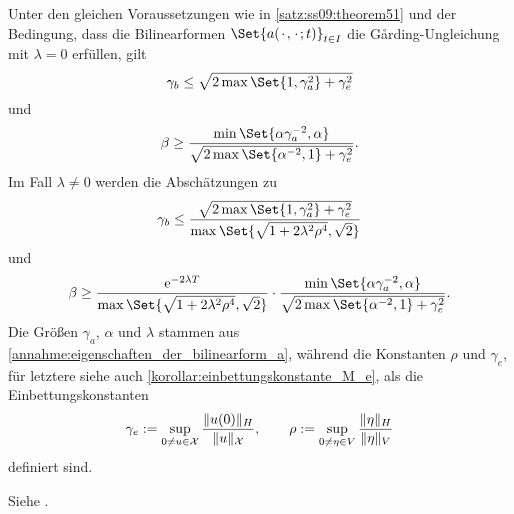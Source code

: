 \documentclass[../main.tex]{subfiles}
\begin{document}
\begin{Korollar}
\label{korrolar:ss09:theorem51_abschaetzungen}
    Unter den gleichen Voraussetzungen wie in \cref{satz:ss09:theorem51} und der Bedingung, dass die Bilinearformen $\Set{a(\blank, \blank; t)}_{t \in I}$ die G\aa{}rding-Ungleichung mit $\lambda = 0$ erfüllen, gilt
    \begin{equation}
        \label{eq:ss09:theorem51_abschaetzungen:lambda_null:stetig}
        \gamma_{b}  \leq \sqrt{2 \max\Set{1, \gamma_{a}^{2}} + \gamma_{e}^{2}}
    \end{equation}
    und
    \begin{equation}
        \label{eq:ss09:theorem51_abschaetzungen:lambda_null:inf_sup}
        \beta  \geq \frac{\min\Set{\alpha \gamma_{a}^{-2}, \alpha}}{\sqrt{2 \max \Set{\alpha^{-2}, 1} + \gamma_{e}^{2}}}.
    \end{equation}
    Im Fall $\lambda \neq 0$ werden die Abschätzungen zu
    \begin{equation}
        \label{eq:ss09:theorem51_abschaetzungen:lambda_nicht_null:stetig}
        \gamma_{b}  \leq \frac{\sqrt{2\max\Set{1, \gamma_{a}^{2}} + \gamma_{e}^{2}}}{\max\Set{\sqrt{1 + 2 \lambda^{2} \rho^{4}}, \sqrt{2}}}
    \end{equation}
    und
    \begin{equation}
        \label{eq:ss09:theorem51_abschaetzungen:lambda_nicht_null:inf_sup}
        \beta  \geq \frac{ \ee^{-2 \lambda T}}{\max\Set{\sqrt{1 + 2 \lambda^{2} \rho^{4}}, \sqrt{2}}  } \cdot \frac{\min\Set{\alpha \gamma_{a}^{-2}, \alpha}}{\sqrt{2 \max\Set{ \alpha^{-2}, 1} + \gamma_{e}^{2}}}.
    \end{equation}
    Die Größen $\gamma_{a}$, $\alpha$ und $\lambda$ stammen aus \cref{annahme:eigenschaften_der_bilinearform_a},
    während die Konstanten $\rho$ und $\gamma_{e}$, für letztere siehe auch \cref{korollar:einbettungskonstante_M_e}, als die Einbettungskonstanten
    \begin{equation}
        \label{eq:ss09:einbettungskonstanten}
        \gamma_{e} := \sup_{0 \neq u \in \mathcal X} \frac{\lVert u(0)\rVert_{H}}{\lVert u\rVert_{\mathcal X}}, \qquad
        \rho := \sup_{0 \neq \eta \in V} \frac{\lVert\eta\rVert_{H}}{\lVert\eta\rVert_{V}}
    \end{equation}
    definiert sind.

    \begin{Beweis}
        Siehe \cite[Appendix A]{Schwab:2009ec}.
    \end{Beweis}
\end{Korollar}
\end{document}
